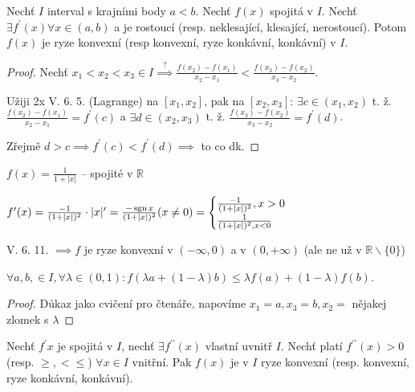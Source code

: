 \begin{veta}
  Nechť $I$ interval s krajními body $a < b$. Nechť $f(x)$ spojitá v $I$. Nechť $\exists f^\prime (x) \forall x \in (a,b)$ a je rostoucí (resp. neklesající, klesající, nerostoucí). Potom $f(x)$ je ryze konvexní (resp konvexní, ryze konkávní, konkávní) v $I$.
\end{veta}

\begin{proof}
  Nechť $x_1 < x_2 < x_3 \in I \stackrel{?}{\implies} \frac{f(x_2)-f(x_1)}{x_2-x_1} < \frac{f(x_3)-f(x_2)}{x_3-x_2}$.

  Užiji 2x V. 6. 5. (Lagrange) na $[x_1, x_2]$, pak na $[x_2, x_3]$: $\exists c \in (x_1, x_2)$ t. ž. $\frac{f(x_2)-f(x_1)}{x_2-x_1} = f^\prime(c)$ a $\exists d \in (x_2, x_3)$ t. ž. $\frac{f(x_3)-f(x_2)}{x_3-x_2}= f^\prime(d)$.

  Zřejmě $d>c \implies f^\prime (c) < f^\prime (d) \implies$ to co dk.
\end{proof}

\begin{priklad}
  $f(x) = \frac{1}{1+|x|}$ -- spojité v $\mathbb R$

  $f^\prime (x) = \frac{-1}{(1+|x|)^2} \cdot |x|^\prime = \frac{-\operatorname{sgn} x}{(1+|x|)^2}(x \neq 0)=\begin{cases}
    \frac{-1}{(1+|x|)^2}, x >0 \\ \frac{1}{(1+|x|)^2, x < 0}
  \end{cases}$

  V. 6. 11. $\implies f$ je ryze konvexní v $(-\infty, 0)$ a v $(0, +\infty)$ (ale ne už v $\mathbb R \smallsetminus \{0\}$)
\end{priklad}

\begin{poznamka}
  $\forall a, b, \in I, \forall \lambda \in (0, 1): f(\lambda a + (1-\lambda) b) \leq \lambda f(a) + (1-\lambda)f(b)$.
\end{poznamka}

\begin{proof}
  Důkaz jako cvičení pro čtenáře, napovíme $x_1 = a, x_3 = b, x_2 = $ nějakej zlomek s $\lambda$
\end{proof}

\begin{veta}
  Nechť $f^\prime x$ je spojitá v $I$, nechť $\exists f^{\prime\prime}(x)$ vlastní uvnitř $I$. Nechť platí $f^{\prime\prime}(x)>0$ (resp. $\geq, < \leq$) $\forall x \in I$ vnitřní. Pak $f(x)$ je v $I$ ryze konvexní (resp. konvexní, ryze konkávní, konkávní).
\end{veta}

